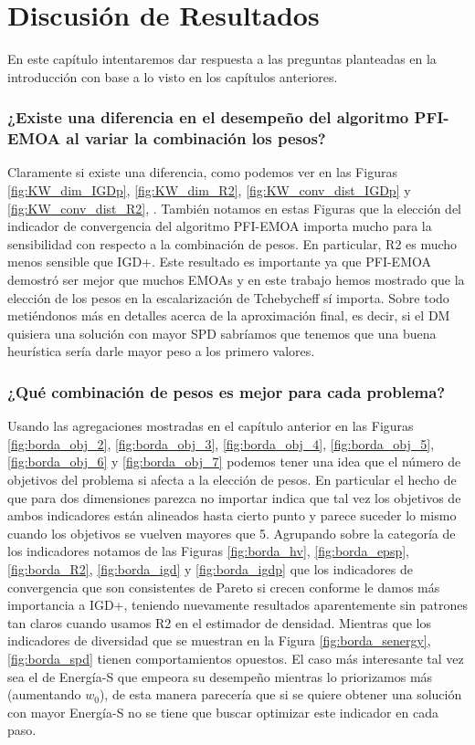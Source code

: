 \chapter{Discusión de Resultados}

En este capítulo intentaremos dar respuesta a las preguntas planteadas en la introducción con base a lo visto en los capítulos anteriores.

\subsection*{¿Existe una diferencia en el desempeño del algoritmo PFI-EMOA al variar la combinación los pesos?}

Claramente si existe una diferencia, como podemos ver en las Figuras \ref{fig:KW_dim_IGDp}, \ref{fig:KW_dim_R2}, \ref{fig:KW_conv_dist_IGDp} y \ref{fig:KW_conv_dist_R2}, . También notamos en estas Figuras que la elección del indicador de convergencia del algoritmo PFI-EMOA importa mucho para la sensibilidad con respecto a la combinación de pesos. En particular, R2 es mucho menos sensible que IGD+. Este resultado es importante ya que PFI-EMOA demostró ser mejor que muchos EMOAs  y en este trabajo hemos mostrado que la elección de los pesos en la escalarización de Tchebycheff sí importa. Sobre todo metiéndonos más en detalles acerca de la aproximación final, es decir, si el DM quisiera una solución con mayor SPD sabríamos que tenemos que una buena heurística sería darle mayor peso a los primero valores. 

\subsection*{¿Qué combinación de pesos es mejor para cada problema?}

Usando las agregaciones mostradas en el capítulo anterior en las Figuras \ref{fig:borda_obj_2}, \ref{fig:borda_obj_3}, \ref{fig:borda_obj_4}, \ref{fig:borda_obj_5}, \ref{fig:borda_obj_6} y \ref{fig:borda_obj_7} podemos tener una idea que el número de objetivos del problema si afecta a la elección de pesos. En particular el hecho de que para dos dimensiones parezca no importar indica que tal vez los objetivos de ambos indicadores están alineados hasta cierto punto y parece suceder lo mismo cuando los objetivos se vuelven mayores que 5. Agrupando sobre la categoría de los indicadores notamos de las Figuras \ref{fig:borda_hv}, \ref{fig:borda_epsp}, \ref{fig:borda_R2}, \ref{fig:borda_igd} y \ref{fig:borda_igdp}  que los indicadores de convergencia que son consistentes de Pareto si crecen conforme le damos más importancia a IGD+, teniendo nuevamente resultados aparentemente sin patrones tan claros cuando usamos R2 en el estimador de densidad. Mientras que los indicadores de diversidad que se muestran en la Figura \ref{fig:borda_senergy}, \ref{fig:borda_spd} tienen comportamientos opuestos. El caso más interesante tal vez sea el de Energía-S que empeora su desempeño mientras lo priorizamos más (aumentando $w_0$), de esta manera parecería que si se quiere obtener una solución con mayor Energía-S no se tiene que buscar optimizar este indicador en cada paso.   

